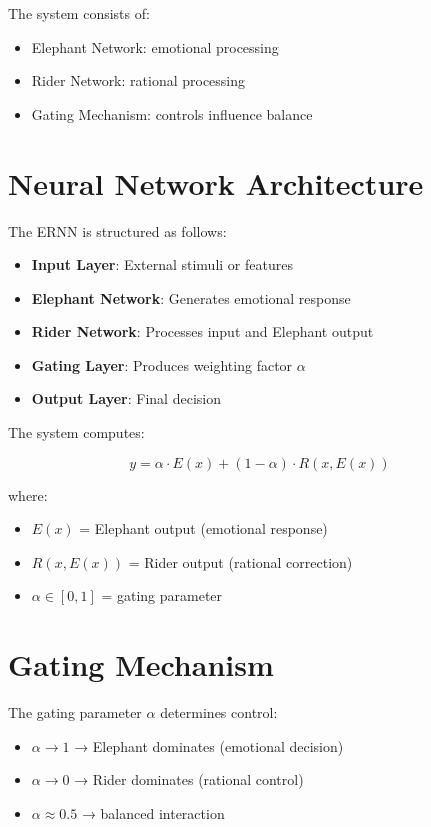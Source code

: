 \documentclass[12pt]{article}
\begin{document}
The system consists of:

\begin{itemize}
\item Elephant Network: emotional processing
\item Rider Network: rational processing
\item Gating Mechanism: controls influence balance
\end{itemize}

\section{Neural Network Architecture}

The ERNN is structured as follows:

\begin{itemize}
\item \textbf{Input Layer}: External stimuli or features
\item \textbf{Elephant Network}: Generates emotional response
\item \textbf{Rider Network}: Processes input and Elephant output
\item \textbf{Gating Layer}: Produces weighting factor $\alpha$
\item \textbf{Output Layer}: Final decision
\end{itemize}

The system computes:

\[
y = \alpha \cdot E(x) + (1 - \alpha) \cdot R(x, E(x))
\]

where:

\begin{itemize}
\item $E(x)$ = Elephant output (emotional response)
\item $R(x, E(x))$ = Rider output (rational correction)
\item $\alpha \in [0,1]$ = gating parameter
\end{itemize}

\section{Gating Mechanism}

The gating parameter $\alpha$ determines control:

\begin{itemize}
\item $\alpha \rightarrow 1$ → Elephant dominates (emotional decision)
\item $\alpha \rightarrow 0$ → Rider dominates (rational control)
\item $\alpha \approx 0.5$ → balanced interaction
\end{itemize}
\end{document}
